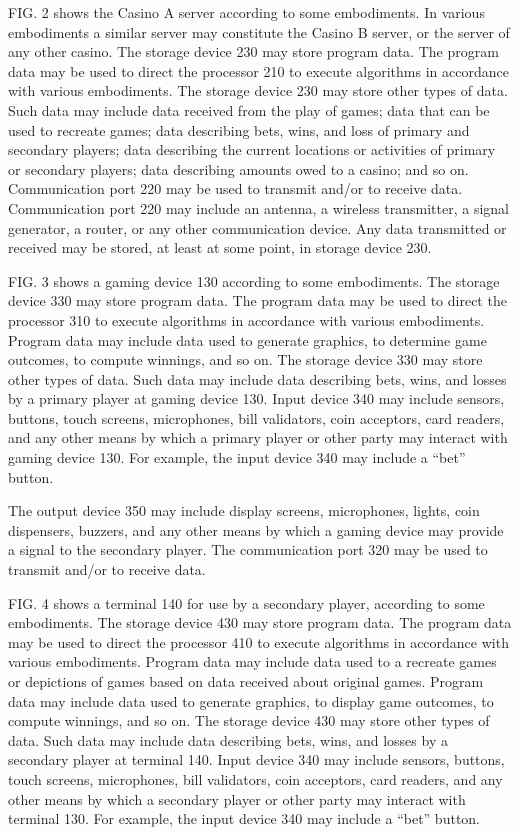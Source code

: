\documentclass[11pt,a4paper]{article}
\begin{document}
FIG. 2 shows the Casino A server according to some embodiments. In various embodiments a similar server may constitute the Casino B server, or the server of any other casino. The storage device 230 may store program data. The program data may be used to direct the processor 210 to execute algorithms in accordance with various embodiments. The storage device 230 may store other types of data. Such data may include data received from the play of games; data that can be used to recreate games; data describing bets, wins, and loss of primary and secondary players; data describing the current locations or activities of primary or secondary players; data describing amounts owed to a casino; and so on. Communication port 220 may be used to transmit and/or to receive data. Communication port 220 may include an antenna, a wireless transmitter, a signal generator, a router, or any other communication device. Any data transmitted or received may be stored, at least at some point, in storage device 230.

FIG. 3 shows a gaming device 130 according to some embodiments. The storage device 330 may store program data. The program data may be used to direct the processor 310 to execute algorithms in accordance with various embodiments. Program data may include data used to generate graphics, to determine game outcomes, to compute winnings, and so on. The storage device 330 may store other types of data. Such data may include data describing bets, wins, and losses by a primary player at gaming device 130. Input device 340 may include sensors, buttons, touch screens, microphones, bill validators, coin acceptors, card readers, and any other means by which a primary player or other party may interact with gaming device 130. For example, the input device 340 may include a “bet” button.

The output device 350 may include display screens, microphones, lights, coin dispensers, buzzers, and any other means by which a gaming device may provide a signal to the secondary player. The communication port 320 may be used to transmit and/or to receive data.

FIG. 4 shows a terminal 140 for use by a secondary player, according to some embodiments. The storage device 430 may store program data. The program data may be used to direct the processor 410 to execute algorithms in accordance with various embodiments. Program data may include data used to a recreate games or depictions of games based on data received about original games. Program data may include data used to generate graphics, to display game outcomes, to compute winnings, and so on. The storage device 430 may store other types of data. Such data may include data describing bets, wins, and losses by a secondary player at terminal 140. Input device 340 may include sensors, buttons, touch screens, microphones, bill validators, coin acceptors, card readers, and any other means by which a secondary player or other party may interact with terminal 130. For example, the input device 340 may include a “bet” button.
\end{document}
